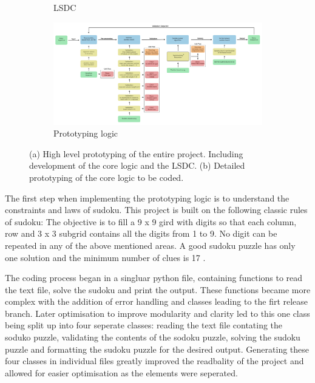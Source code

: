 \documentclass{report}
\begin{document}
\begin{figure}[htbp]
\begin{subfigure}[b]{0.14\textwidth}
        \caption{LSDC}
        \label{fig:figure1}
    \end{subfigure}
    \hfill
    \begin{subfigure}[b]{0.84\textwidth}
        \centering
        \includegraphics[width=\textwidth]{Images/prototyping.jpg}
        \caption{Prototyping logic}
        \label{fig:figure2}
    \end{subfigure}
    \caption{(a) High level prototyping of the entire project.
    Including development of the core logic and the LSDC. (b) Detailed prototyping of the core logic to be coded.}
    \label{fig:both_figures}
\end{figure}

The first step when implementing the prototyping logic is to understand the constraints and laws of sudoku.
This project is built on the following classic rules of sudoku\cite{1}:
The objective is to fill a 9 x 9 gird with digits so that each column, row and 3 x 3 subgrid contains all the digits from 1 to 9.
No digit can be repeated in any of the above mentioned areas.
A good sudoku puzzle has only one solution and the minimum number of clues is 17 \cite{2}.


The coding process began in a singluar python file, containing functions to read the text file, solve the sudoku and print the output.
These functions became more complex with the addition of error handling and classes leading to the firt release branch.
Later optimisation to improve modularity and clarity led to this one class being split up into
four seperate classes: reading the text file contating the soduko puzzle,
validating the contents of the sodoku puzzle, solving the sudoku puzzle and formatting the sudoku puzzle for the desired output.
Generating these four classes in individual files greatly improved the readbality of the project
and allowed for easier optimisation as the elements were seperated.
\end{document}
